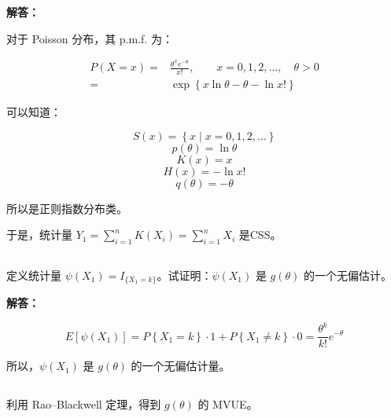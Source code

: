 \documentclass[12pt,a4paper]{article}
\begin{document}
\begin{answerbox}
\textbf{解答：}

对于 Poisson 分布，其 p.m.f. 为：

$$
\begin{aligned}
P(X=x) =& \frac{\theta^x e^{-\theta}}{x!},\qquad x=0,1,2,\ldots,\quad \theta>0 \\
=& \exp\left\{x \ln \theta - \theta - \ln x!\right\}
\end{aligned}
$$

可以知道：

$$
S(x) = \left\{x \mid x = 0, 1, 2, \ldots\right\}
$$
$$
p(\theta) = \ln \theta
$$
$$
K(x) = x
$$
$$
H(x) = -\ln x!
$$
$$
q(\theta) = -\theta
$$

所以是正则指数分布类。

于是，统计量 $Y_1 = \sum_{i=1}^{n} K(X_i) = \sum_{i=1}^{n} X_i$ 是CSS。

\end{answerbox}

\subsection{}

定义统计量 $\psi(X_1)=I_{\{X_1=k\}}$。试证明：$\psi(X_1)$ 是 $g(\theta)$ 的一个无偏估计。

\begin{answerbox}
\textbf{解答：}

$$
E\left[\psi(X_1)\right] = P\left\{X_1=k\right\} \cdot 1 + P\left\{X_1 \neq k\right\} \cdot 0 = \frac{\theta^k}{k!}e^{-\theta} 
$$

所以，$\psi(X_1)$ 是 $g(\theta)$ 的一个无偏估计量。

\end{answerbox}

\subsection{}

利用 Rao--Blackwell 定理，得到 $g(\theta)$ 的 MVUE。
\end{document}
